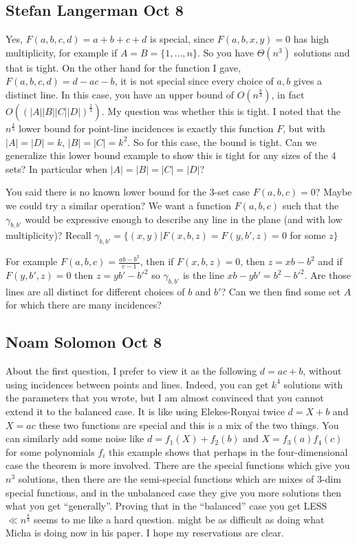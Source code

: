 \subsection{Stefan Langerman Oct 8}
Yes, $F(a,b,c,d)=a+b+c+d$ is special, since $F(a,b,x,y)=0$ has high
multiplicity, for example if $A = B = \{1,...,n\}$. So you have $\Theta(n^3)$
solutions and that is tight.
On the other hand for the function I gave, $F(a,b,c,d) = d-ac-b$, it is
not special since every choice of $a,b$ gives a distinct line. In this
case, you have an upper bound of $O(n^{\frac{8}{3}})$, in fact
$O((|A||B||C||D|)^{\frac{2}{3}})$. My question was whether this is tight. I
noted that the $n^{\frac{4}{3}}$ lower bound for point-line incidences is exactly
this function $F$, but with $|A|=|D|=k$, $|B|=|C|=k^2$. So for this case,
the bound is tight. Can we generalize this lower bound example to show
this is tight for any sizes of the 4 sets? In particular when
$|A|=|B|=|C|=|D|$?

You said there is no known lower bound for the 3-set case $F(a,b,c)=0$?
Maybe we could try a similar operation?
We want a function $F(a,b,c)$ such that the $\gamma_{b,b'}$ would be
expressive enough to describe any line in the plane (and with low
multiplicity)?
Recall $\gamma_{b,b'} = \{(x,y)|F(x,b,z)=F(y,b',z)=0$ for some $z\}$

For example $F(a,b,c)= \frac{ab-b^2}{c-1}$, then if $F(x,b,z)=0$, then $z=xb-b^2$
and if $F(y,b',z)=0$ then $z = yb'-b'^2$ so $\gamma_{b,b'}$ is the line
$xb-yb'=b^2-b'^2$. Are those lines are all distinct for different
choices of $b$ and $b'$? Can we then find some set $A$ for which there are
many incidences?

\subsection{Noam Solomon Oct 8}
About the first question, I prefer to view it as the following
$d=ac+b$, without using incidences between points and lines.
Indeed, you can get $k^4$ solutions with the parameters that you wrote, but I
am almost convinced that you cannot extend it to the balanced case. It is
like using Elekes-Ronyai twice
$d = X + b$ and $X = ac$
these two functions are special and this is a mix of the two things. You
can similarly add some noise like
$d = f_1(X) + f_2(b)$ and $X = f_3(a)f_4(c)$
for some polynomials $f_i$
this example shows that perhaps in the four-dimensional case the theorem is
more involved.
There are the special functions which give you $n^3$ solutions,
then there are the semi-special functions which are mixes of 3-dim special
functions, and in the unbalanced case they give you more solutions then
what you get ``generally''.
Proving that in the ``balanced'' case you get LESS $\ll n^{\frac{8}{3}}$ seems to me
like a hard question. might be as difficult as doing what Micha is doing
now in his paper. I hope my reservations are clear.

